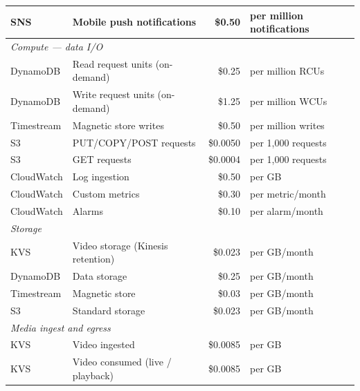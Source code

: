 {\begin{tabular}{llrl}
    SNS                 & Mobile push notifications             & \$0.50    & per million notifications \\
    \hline
    \multicolumn{4}{l}{\textit{Compute --- data I/O}} \\
    DynamoDB            & Read request units (on-demand)        & \$0.25    & per million RCUs \\
    DynamoDB            & Write request units (on-demand)       & \$1.25    & per million WCUs \\
    Timestream          & Magnetic store writes                 & \$0.50    & per million writes \\
    S3                  & PUT/COPY/POST requests                & \$0.0050  & per 1,000 requests \\
    S3                  & GET requests                          & \$0.0004  & per 1,000 requests \\
    CloudWatch          & Log ingestion                         & \$0.50    & per GB \\
    CloudWatch          & Custom metrics                        & \$0.30    & per metric/month \\
    CloudWatch          & Alarms                                & \$0.10    & per alarm/month \\
    \hline
    \multicolumn{4}{l}{\textit{Storage}} \\
    KVS                 & Video storage (Kinesis retention)     & \$0.023   & per GB/month \\
    DynamoDB            & Data storage                          & \$0.25    & per GB/month \\
    Timestream          & Magnetic store                        & \$0.03    & per GB/month \\
    S3                  & Standard storage                      & \$0.023   & per GB/month \\
    \hline
    \multicolumn{4}{l}{\textit{Media ingest and egress}} \\
    KVS                 & Video ingested                        & \$0.0085  & per GB \\
    KVS                 & Video consumed (live / playback)      & \$0.0085  & per GB \\
    \hline
  \end{tabular}
\par
}
